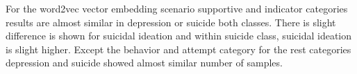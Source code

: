 \documentclass[sn-mathphys,Numbered]{sn-jnl}%
\theoremstyle{thmstyleone}%
\theoremstyle{thmstyletwo}%
\theoremstyle{thmstylethree}%
\begin{document}
For the word2vec vector embedding scenario supportive and indicator categories results are almost similar in depression or suicide both classes. There is slight difference is shown for suicidal ideation and within suicide class, suicidal ideation is slight higher. Except the behavior and attempt category for the rest categories depression and suicide showed almost similar number of samples. 
%        
\end{document}
